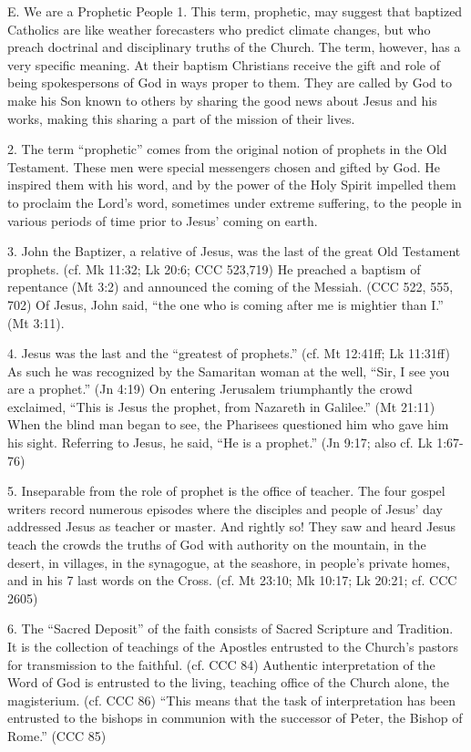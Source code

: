 \documentclass[oneside]{book}
\begin{document}
E. We are a Prophetic People
1. This term, prophetic, may suggest that baptized Catholics are like weather
forecasters who predict climate changes, but who preach doctrinal and
disciplinary truths of the Church. The term, however, has a very specific
meaning. At their baptism Christians receive the gift and role of being
spokespersons of God in ways proper to them. They are called by God to make his
Son known to others by sharing the good news about Jesus and his works, making
this sharing a part of the mission of their lives.

2. The term ``prophetic'' comes from the original notion of prophets in the Old
Testament. These men were special messengers chosen and gifted by God. He
inspired them with his word, and by the power of the Holy Spirit impelled them
to proclaim the Lord's word, sometimes under extreme suffering, to the people in
various periods of time prior to Jesus' coming on earth.

3. John the Baptizer, a relative of Jesus, was the last of the great Old
Testament prophets. (cf. Mk 11:32; Lk 20:6; CCC 523,719) He preached a baptism
of repentance (Mt 3:2) and announced the coming of the Messiah. (CCC 522, 555,
702) Of Jesus, John said, ``the one who is coming after me is mightier than I.''
(Mt 3:11).

4. Jesus was the last and the ``greatest of prophets.'' (cf. Mt 12:41ff; Lk
11:31ff) As such he was recognized by the Samaritan woman at the well, ``Sir, I
see you are a prophet.'' (Jn 4:19) On entering Jerusalem triumphantly the crowd
exclaimed, ``This is Jesus the prophet, from Nazareth in Galilee.'' (Mt 21:11)
When the blind man began to see, the Pharisees questioned him who gave him his
sight. Referring to Jesus, he said, ``He is a prophet.'' (Jn 9:17; also cf. Lk
1:67-76)

5. Inseparable from the role of prophet is the office of teacher. The four
gospel writers record numerous episodes where the disciples and people of Jesus'
day addressed Jesus as teacher or master. And rightly so! They saw and heard
Jesus teach the crowds the truths of God with authority on the mountain, in the
desert, in villages, in the synagogue, at the seashore, in people's private
homes, and in his 7 last words on the Cross. (cf. Mt 23:10; Mk 10:17; Lk 20:21;
cf. CCC 2605)

6. The ``Sacred Deposit'' of the faith consists of Sacred Scripture and
Tradition. It is the collection of teachings of the Apostles entrusted to the
Church's pastors for transmission to the faithful. (cf. CCC 84) Authentic
interpretation of the Word of God is entrusted to the living, teaching office of
the Church alone, the magisterium. (cf. CCC 86) ``This means that the task of
interpretation has been entrusted to the bishops in communion with the successor
of Peter, the Bishop of Rome.'' (CCC 85)
\end{document}
